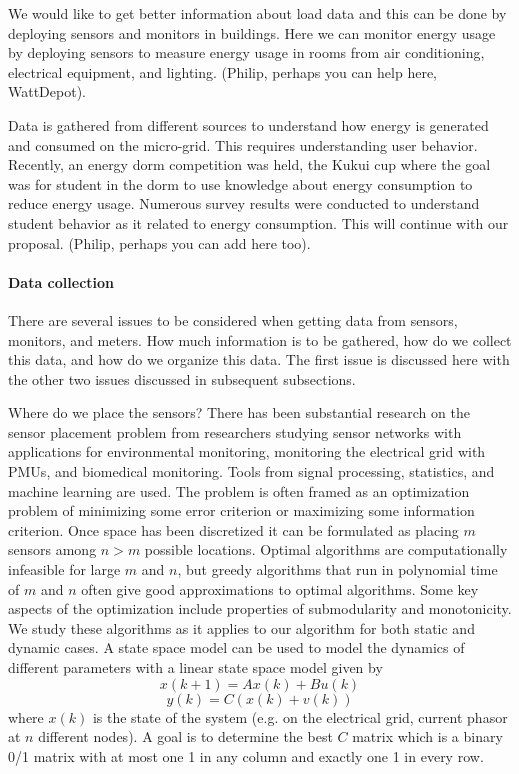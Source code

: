 We would like to get better information about load data and this can be
done by deploying sensors and monitors in buildings.  Here we can monitor
energy usage by deploying sensors to measure energy usage in rooms from air
conditioning, electrical equipment, and lighting.  (Philip, perhaps you can
help here, WattDepot).
 
Data is gathered from different sources to understand how energy is
generated and consumed on the micro-grid.  This requires understanding user
behavior.  Recently, an energy dorm competition was held, the Kukui cup
where the goal was for student in the dorm to use knowledge about energy
consumption to reduce energy usage.  Numerous survey results were conducted
to understand student behavior as it related to energy consumption.  This
will continue with our proposal.  (Philip, perhaps you can add here too).
 
\paragraph{Data collection}

There are several issues to be considered when getting data from sensors, monitors, and meters.
How much information is to be gathered, how do we collect this data, and how do we organize
this data.  The first issue is discussed here with the other two issues discussed in subsequent
subsections.

Where do we place the sensors?  There has been substantial research on the sensor placement
problem from researchers studying sensor networks with applications for environmental
monitoring, monitoring the electrical grid with PMUs, and biomedical monitoring.  Tools from
signal processing, statistics, and machine learning are used.  The problem is often
framed as an optimization problem of minimizing some error criterion or maximizing some
information criterion.    Once space has been discretized it can be formulated as placing
$m$ sensors among $n>m$ possible locations.  Optimal algorithms are computationally
infeasible for large $m$ and $n$, but greedy algorithms that run in polynomial time of $m$
and $n$ often give good approximations to optimal algorithms.   Some key aspects of the
optimization include properties of submodularity and monotonicity.    We study these algorithms
as it applies to our algorithm for both static and dynamic cases.    A state space model can
be used to model the dynamics of different parameters with a linear state space model given
by 
\begin{displaymath}
x(k+1) = A x(k) + B u(k)
\end{displaymath}
\begin{displaymath}
y(k) = C (x(k) + v(k))
\end{displaymath}
where $x(k)$ is the state of the system (e.g. on the electrical grid, current phasor at $n$ different
nodes).  A goal is to determine the best $C$ matrix which is a binary 0/1 matrix with at most one
1 in any column and exactly one 1 in every row.


